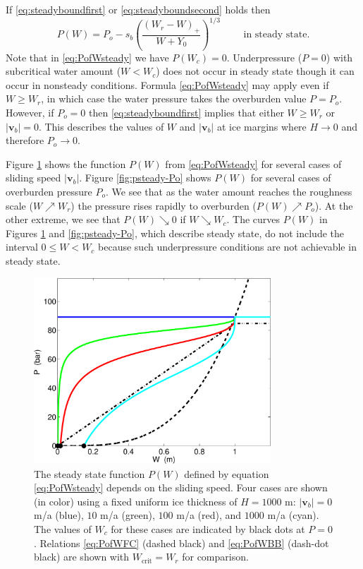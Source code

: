 \documentclass[11pt,final]{amsart}
\newcommand\bv{\mathbf{v}}
\begin{document}
If \eqref{eq:steadyboundfirst} or \eqref{eq:steadyboundsecond} holds then
\begin{equation}
P(W) = P_o - s_b \left(\frac{(W_r - W)_+}{W+Y_0}\right)^{1/3} \qquad \text{ in steady state}.  \label{eq:PofWsteady}
\end{equation}
Note that in \eqref{eq:PofWsteady} we have $P(W_c)=0$.  Underpressure ($P=0$) with subcritical water amount ($W<W_c$) does not occur in steady state though it can occur in nonsteady conditions.  Formula \eqref{eq:PofWsteady} may apply even if $W\ge W_r$, in which case the water pressure takes the overburden value $P = P_o$.  However, if $P_o=0$ then \eqref{eq:steadyboundfirst} implies that either $W\ge W_r$ or $|\bv_b|=0$.  This describes the values of $W$ and $|\bv_b|$ at ice margins where $H\to 0$ and therefore $P_o\to 0$.

\newcommand{\upto}{ \!\!\nearrow\! }
\newcommand{\downto}{ \!\searrow\! }
Figure \ref{fig:psteady-vb} shows the function $P(W)$ from \eqref{eq:PofWsteady} for several cases of sliding speed $|\bv_b|$.  Figure \ref{fig:psteady-Po} shows $P(W)$ for several cases of overburden pressure $P_o$.  We see that as the water amount reaches the roughness scale ($W\upto W_r$) the pressure rises rapidly to overburden ($P(W) \upto P_o$).  At the other extreme, we see that $P(W) \downto 0$ if $W \downto W_c$.  The curves $P(W)$ in Figures \ref{fig:psteady-vb} and \ref{fig:psteady-Po}, which describe steady state, do not include the interval $0\le W < W_c$ because such underpressure conditions are not achievable in steady state.

\begin{figure}[ht]
\includegraphics[width=3.5in,keepaspectratio=true]{psteady-vb}
\medskip
\caption{The steady state function $P(W)$ defined by equation \eqref{eq:PofWsteady} depends on the sliding speed.  Four cases are shown (in color) using a fixed uniform ice thickness of $H=1000$ m: $|\bv_b|=0$ m/a (blue), $10$ m/a (green), $100$ m/a (red), and $1000$ m/a (cyan).  The values of $W_c$ for these cases are indicated by black dots at $P=0$.  Relations \eqref{eq:PofWFC} (dashed black) and \eqref{eq:PofWBB} (dash-dot black) are shown with $W_{\text{crit}}=W_r$ for comparison.}
\label{fig:psteady-vb}
\end{figure}
\end{document}
